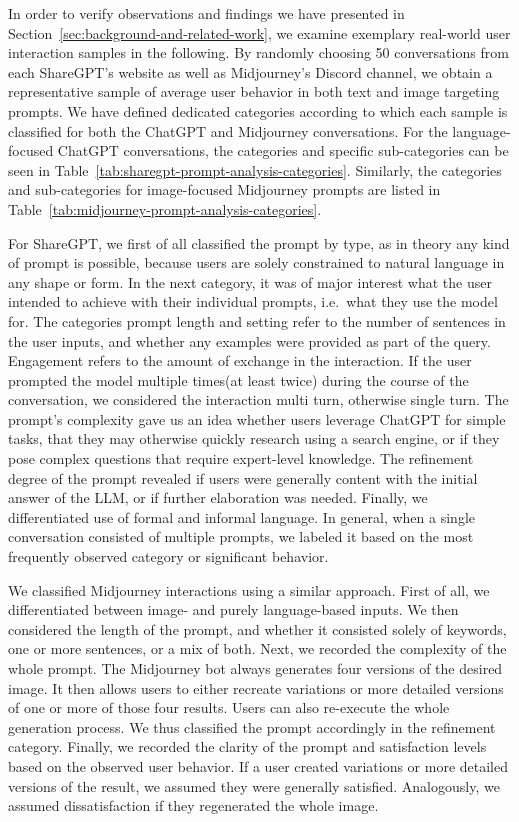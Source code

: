 In order to verify observations and findings we have presented in Section~\ref{sec:background-and-related-work},
we examine exemplary real-world user interaction samples in the following.
By randomly choosing 50 conversations from each ShareGPT's website as well as Midjourney's Discord
channel, we obtain a representative sample of average user behavior in both text and image targeting prompts.
We have defined dedicated categories according to which each sample is classified for both
the ChatGPT and Midjourney conversations.
For the language-focused ChatGPT conversations, the categories and specific sub-categories can be
seen in Table~\ref{tab:sharegpt-prompt-analysis-categories}.
Similarly, the categories and sub-categories for image-focused Midjourney prompts are listed
in Table~\ref{tab:midjourney-prompt-analysis-categories}.

For ShareGPT, we first of all classified the prompt by type, as in theory any kind of prompt is
possible, because users are solely constrained to natural language in any shape or form.
In the next category, it was of major interest what the user intended to achieve with their
individual prompts,
i.e.\ what they use the model for.
The categories prompt length and setting refer to the number of sentences in the user inputs, and
whether any examples were provided as part of the query.
Engagement refers to the amount of exchange in the interaction.
If the user prompted the model multiple times(at least twice) during the course of the
conversation, we considered the interaction multi turn, otherwise single turn.
The prompt's complexity gave us an idea whether users leverage ChatGPT for simple
tasks, that they may otherwise quickly research using a search engine, or if they pose complex
questions that require expert-level knowledge.
The refinement degree of the prompt revealed if users were generally content with the initial
answer of the LLM, or if further elaboration was needed.
Finally, we differentiated use of formal and informal language.
In general, when a single conversation consisted of multiple prompts, we labeled it based on the
most frequently observed category or significant behavior.

We classified Midjourney interactions using a similar approach.
First of all, we differentiated between image- and purely language-based inputs.
We then considered the length of the prompt, and whether it consisted solely of keywords, one
or more sentences, or a mix of both.
Next, we recorded the complexity of the whole prompt.
The Midjourney bot always generates four versions of the desired image.
It then allows users to either recreate variations or more detailed versions of one or more of
those four results.
Users can also re-execute the whole generation process.
We thus classified the prompt accordingly in the refinement category.
Finally, we recorded the clarity of the prompt and satisfaction levels based
on the observed user behavior.
If a user created variations or more detailed versions of the result, we assumed they were
generally satisfied.
Analogously, we assumed dissatisfaction if they regenerated the whole image.

